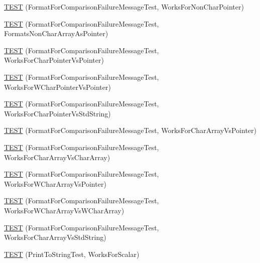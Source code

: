 \begin{DoxyCompactItemize}
\item 
\mbox{\hyperlink{namespacetesting_1_1gtest__printers__test_adb093d9323bfb766be8c91215c46056e}{T\+E\+ST}} (Format\+For\+Comparison\+Failure\+Message\+Test, Works\+For\+Non\+Char\+Pointer)
\item 
\mbox{\hyperlink{namespacetesting_1_1gtest__printers__test_a3571808f93f419268b6aed1aa127ea30}{T\+E\+ST}} (Format\+For\+Comparison\+Failure\+Message\+Test, Formats\+Non\+Char\+Array\+As\+Pointer)
\item 
\mbox{\hyperlink{namespacetesting_1_1gtest__printers__test_a1694d4063da702f5379495d3cb2cbc91}{T\+E\+ST}} (Format\+For\+Comparison\+Failure\+Message\+Test, Works\+For\+Char\+Pointer\+Vs\+Pointer)
\item 
\mbox{\hyperlink{namespacetesting_1_1gtest__printers__test_a735171f4ba0a9dffee9c4c7321107822}{T\+E\+ST}} (Format\+For\+Comparison\+Failure\+Message\+Test, Works\+For\+W\+Char\+Pointer\+Vs\+Pointer)
\item 
\mbox{\hyperlink{namespacetesting_1_1gtest__printers__test_ab5a910170489276c14b817b70d4feb96}{T\+E\+ST}} (Format\+For\+Comparison\+Failure\+Message\+Test, Works\+For\+Char\+Pointer\+Vs\+Std\+String)
\item 
\mbox{\hyperlink{namespacetesting_1_1gtest__printers__test_ac25834e0463cf9f3d231db24e7b220e5}{T\+E\+ST}} (Format\+For\+Comparison\+Failure\+Message\+Test, Works\+For\+Char\+Array\+Vs\+Pointer)
\item 
\mbox{\hyperlink{namespacetesting_1_1gtest__printers__test_aba32640344f0186de5fbb6bb47e0c5a5}{T\+E\+ST}} (Format\+For\+Comparison\+Failure\+Message\+Test, Works\+For\+Char\+Array\+Vs\+Char\+Array)
\item 
\mbox{\hyperlink{namespacetesting_1_1gtest__printers__test_a1e95289500400eff5fdcd45c5864a6d2}{T\+E\+ST}} (Format\+For\+Comparison\+Failure\+Message\+Test, Works\+For\+W\+Char\+Array\+Vs\+Pointer)
\item 
\mbox{\hyperlink{namespacetesting_1_1gtest__printers__test_af4b502fb5745d2ee0bfb81d1c8eb95f6}{T\+E\+ST}} (Format\+For\+Comparison\+Failure\+Message\+Test, Works\+For\+W\+Char\+Array\+Vs\+W\+Char\+Array)
\item 
\mbox{\hyperlink{namespacetesting_1_1gtest__printers__test_ac2300073f401f783ff7b1ef97d2cbd6d}{T\+E\+ST}} (Format\+For\+Comparison\+Failure\+Message\+Test, Works\+For\+Char\+Array\+Vs\+Std\+String)
\item 
\mbox{\hyperlink{namespacetesting_1_1gtest__printers__test_a5d1bc4b12c18ccaec2ced9f45c092567}{T\+E\+ST}} (Print\+To\+String\+Test, Works\+For\+Scalar)

\end{DoxyCompactItemize}
